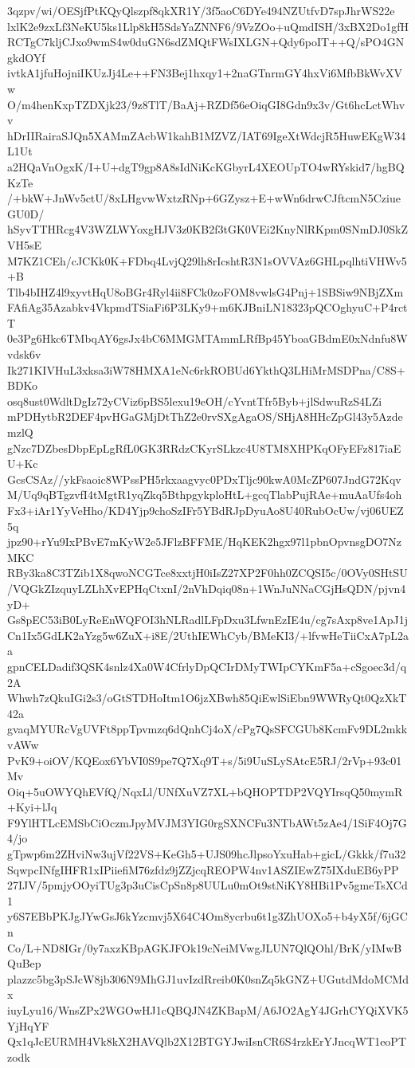3qzpv/wi/OESjfPtKQyQlszpf8qkXR1Y/3f5aoC6DYe494NZUtfvD7spJhrWS22e
lxlK2e9zxLf3NeKU5ks1Llp8kH5SdsYaZNNF6/9VzZOo+uQmdISH/3xBX2Do1gfH
RCTgC7kljCJxo9wmS4w0duGN6sdZMQtFWsIXLGN+Qdy6poIT++Q/sPO4GNgkdOYf
ivtkA1jfuHojniIKUzJj4Le++FN3Bej1hxqy1+2naGTnrmGY4hxVi6MfbBkWvXVw
O/m4henKxpTZDXjk23/9z8TlT/BaAj+RZDf56eOiqGI8Gdn9x3v/Gt6hcLctWhvv
hDrIIRairaSJQn5XAMmZAcbW1kahB1MZVZ/IAT69IgeXtWdcjR5HuwEKgW34L1Ut
a2HQaVnOgxK/I+U+dgT9gp8A8sIdNiKcKGbyrL4XEOUpTO4wRYskid7/hgBQKzTe
/+bkW+JnWv5ctU/8xLHgvwWxtzRNp+6GZysz+E+wWn6drwCJftcmN5CziueGU0D/
hSyvTTHRcg4V3WZLWYoxgHJV3z0KB2f3tGK0VEi2KnyNlRKpm0SNmDJ0SkZVH5sE
M7KZ1CEh/cJCKk0K+FDbq4LvjQ29lh8rIcshtR3N1sOVVAz6GHLpqlhtiVHWv5+B
Tlb4bIHZ4l9xyvtHqU8oBGr4Ryl4ii8FCk0zoFOM8vwlsG4Pnj+1SBSiw9NBjZXm
FAfiAg35Azabkv4VkpmdTSiaFi6P3LKy9+m6KJBniLN18323pQCOghyuC+P4rctT
0e3Pg6Hkc6TMbqAY6gsJx4bC6MMGMTAmmLRfBp45YboaGBdmE0xNdnfu8Wvdsk6v
Ik271KIVHuL3xksa3iW78HMXA1eNc6rkROBUd6YkthQ3LHiMrMSDPna/C8S+BDKo
osq8ust0WdltDgIz72yCViz6pBS5lexu19eOH/cYvntTfr5Byb+jlSdwuRzS4LZi
mPDHytbR2DEF4pvHGaGMjDtThZ2e0rvSXgAgaOS/SHjA8HHcZpGl43y5AzdemzlQ
gNzc7DZbesDbpEpLgRfL0GK3RRdzCKyrSLkzc4U8TM8XHPKqOFyEFz817iaEU+Kc
GcsCSAz//ykFsaoic8WPssPH5rkxaagvyc0PDxTljc90kwA0McZP607JndG72Kqv
M/Uq9qBTgzvfI4tMgtR1yqZkq5BthpgykploHtL+gcqTlabPujRAe+muAaUfs4oh
Fx3+iAr1YyVeHho/KD4Yjp9choSzIFr5YBdRJpDyuAo8U40RubOcUw/vj06UEZ5q
jpz90+rYu9IxPBvE7mKyW2e5JFlzBFFME/HqKEK2hgx97l1pbnOpvnsgDO7NzMKC
RBy3ka8C3TZib1X8qwoNCGTce8xxtjH0iIsZ27XP2F0hh0ZCQSI5c/0OVy0SHtSU
/VQGkZIzquyLZLhXvEPHqCtxnI/2nVhDqiq08n+1WnJuNNaCGjHsQDN/pjvn4yD+
Gs8pEC53iB0LyReEnWQFOI3hNLRadlLFpDxu3LfwnEzIE4u/cg7sAxp8ve1ApJ1j
Cn1Ix5GdLK2aYzg5w6ZuX+i8E/2UthIEWhCyb/BMeKI3/+lfvwHeTiiCxA7pL2aa
gpnCELDadif3QSK4snlz4Xa0W4CfrlyDpQCIrDMyTWIpCYKmF5a+cSgoec3d/q2A
Whwh7zQkuIGi2s3/oGtSTDHoItm1O6jzXBwh85QiEwlSiEbn9WWRyQt0QzXkT42a
gvaqMYURcVgUVFt8ppTpvmzq6dQnhCj4oX/cPg7QsSFCGUb8KcmFv9DL2mkkvAWw
PvK9+oiOV/KQEox6YbVI0S9pe7Q7Xq9T+s/5i9UuSLySAtcE5RJ/2rVp+93c01Mv
Oiq+5uOWYQhEVfQ/NqxLl/UNfXuVZ7XL+bQHOPTDP2VQYIrsqQ50mymR+Kyi+lJq
F9YlHTLcEMSbCiOczmJpyMVJM3YIG0rgSXNCFu3NTbAWt5zAe4/1SiF4Oj7G4/jo
gTpwp6m2ZHviNw3ujVf22VS+KeGh5+UJS09hcJlpsoYxuHab+gicL/Gkkk/f7u32
SqwpcINfgIHFR1xIPiiefiM76zfdz9jZZjcqREOPW4nv1ASZIEwZ75IXduEB6yPP
27IJV/5pmjyOOyiTUg3p3uCisCpSn8p8UULu0mOt9stNiKY8HBi1Pv5gmeTsXCd1
y6S7EBbPKJgJYwGsJ6kYzcmvj5X64C4Om8ycrbu6t1g3ZhUOXo5+b4yX5f/6jGCn
Co/L+ND8IGr/0y7axzKBpAGKJFOk19cNeiMVwgJLUN7QlQOhl/BrK/yIMwBQuBep
plazzc5bg3pSJcW8jb306N9MhGJ1uvIzdRreib0K0snZq5kGNZ+UGutdMdoMCMdx
iuyLyu16/WnsZPx2WGOwHJ1cQBQJN4ZKBapM/A6JO2AgY4JGrhCYQiXVK5YjHqYF
Qx1qJcEURMH4Vk8kX2HAVQlb2X12BTGYJwiIsnCR6S4rzkErYJncqWT1eoPTzodk
